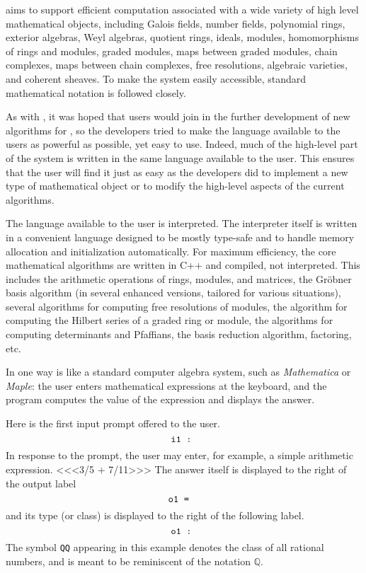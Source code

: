 \Mtwo aims to support efficient computation associated with a wide
variety of high level mathematical objects, including Galois fields,
number fields, polynomial rings, exterior algebras, Weyl algebras,
quotient rings, ideals, modules, homomorphisms of rings and modules,
graded modules, maps between graded modules, chain complexes, maps
between chain complexes, free resolutions, algebraic varieties, and
coherent sheaves.  To make the system easily accessible, standard 
mathematical notation is followed closely.

As with \Macaulay, it was hoped that users would join in the further
development of new algorithms for \Mtwo, so the developers
tried to make the language available to
the users as powerful as possible, yet easy to use.
Indeed, much of the high-level part of the system is written in the same language
available to the user.  This ensures that the user will find it just as easy
as the developers did to implement a new type of mathematical object or to
modify the high-level aspects of the current algorithms.

The language available to the user is interpreted.  The interpreter itself
is written in a convenient language designed to be mostly type-safe and to
handle memory allocation and initialization automatically.  For maximum
efficiency, the core mathematical algorithms are written in C++ and compiled,
not interpreted.  This includes the arithmetic operations of rings, modules,
and matrices, the Gr\"obner basis algorithm (in several enhanced versions,
tailored for various situations), several algorithms for computing free
resolutions of modules, the algorithm for computing the Hilbert series of a
graded ring or module, the algorithms for computing determinants and
Pfaffians, the basis reduction algorithm, factoring, etc.

In one way \Mtwo is like a standard computer algebra system, such as {\sl
Mathematica} or {\sl Maple}: the user enters
mathematical expressions at the keyboard, and the program computes the value
of the expression and displays the answer.

Here is the first input prompt offered to the user.
\[\text{\tt i1\ :\ }\]
In response to the prompt, the user may enter, for example, a simple arithmetic expression.
<<<3/5 + 7/11>>>
The answer itself is displayed to the right of the output
label \[\text{\tt o1\ = \ }\] and its type (or class) is displayed to the
right of the following label.
\[\text{\tt o1\ :\ }\]
The symbol {\tt QQ} appearing in this example 
denotes the class of all rational numbers, and is meant to be reminiscent of
the notation $\mathbb Q$.


